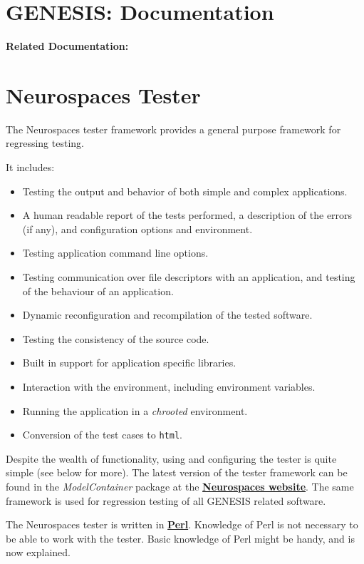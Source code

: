 \documentclass[12pt]{article}
\begin{document}
\section*{GENESIS: Documentation}

{\bf Related Documentation:}

\section*{Neurospaces Tester}

The Neurospaces tester framework provides a general purpose framework for regressing testing.

It includes:
\begin{itemize}
\item Testing the output and behavior of both simple and complex applications.
\item A human readable report of the tests performed, a description of the errors (if any), and configuration options and environment.
\item Testing application command line options.
\item Testing communication over file descriptors with an application, and testing of the behaviour of an application.
\item Dynamic reconfiguration and recompilation of the tested software.
\item Testing the consistency of the source code.
\item Built in support for application specific libraries.
\item Interaction with the environment, including environment variables.
\item Running the application in a {\it chrooted} environment.
\item Conversion of the test cases to {\tt html}. 
\end{itemize}

Despite the wealth of functionality, using and configuring the tester is quite simple (see below for more). The latest version of the tester framework can be found in the {\it ModelContainer} package at the \href{http://www.neurospaces.org/}{\bf Neurospaces website}. The same framework is used for regression testing of all GENESIS related software.

The Neurospaces tester is written in \href{http://www.perl.org/}{\bf Perl}. Knowledge of Perl is not necessary to be able to work with the tester. Basic knowledge of Perl might be handy, and is now explained.
\end{document}

